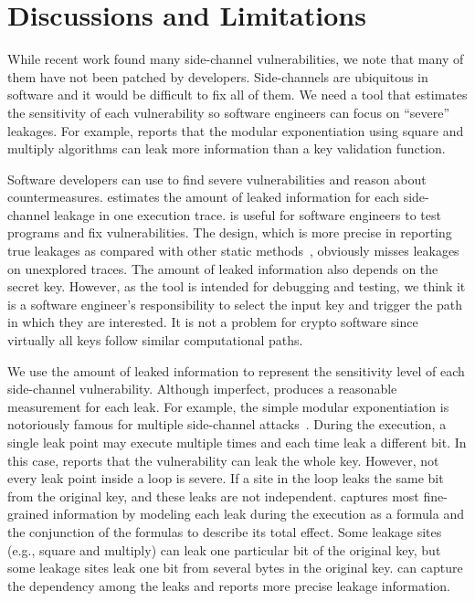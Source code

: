 \section{Discussions and Limitations}
While recent work found many side-channel vulnerabilities, 
we note that many of them have not been patched by developers.
Side-channels are ubiquitous in software and it would be difficult to fix all of them. 
We need a tool that estimates the sensitivity of each vulnerability
so software engineers can focus on
``severe'' leakages. For example, \tool{} reports that 
the modular exponentiation using square and multiply algorithms can
leak more information than a key validation function.

Software developers can use \tool{} to find severe vulnerabilities
and reason about countermeasures.
\tool{} estimates the amount of leaked information for each side-channel leakage
in one execution trace. \tool{} is useful for software
engineers to test programs and fix vulnerabilities.
The design, which is more precise in reporting true leakages as compared with other static
methods~\cite{197207,BacelarAlmeida:2013:FVS:2483313.2483334}, obviously misses
leakages on unexplored traces. The amount of leaked information also depends on the secret key.
However, as the tool is intended for debugging and testing,
we think it is a software engineer's responsibility to select the input key and trigger 
the path in which they are interested. It is not a problem for crypto software 
since virtually all keys follow similar computational paths.

We use the amount of leaked information to represent the sensitivity level of 
each side-channel vulnerability. Although imperfect, \tool{} produces a reasonable 
measurement for each leak. For example, the simple modular exponentiation is 
notoriously famous for multiple side-channel attacks~\cite{kocher1996timing}. 
During the execution, a single leak point may execute multiple times
and each time leak a different bit. In this case, \tool{} reports that the 
vulnerability can leak the whole key. However, not every leak point inside a 
loop is severe. If a site in the loop leaks the same bit from the 
original key, and these leaks are not independent. \tool{} captures most 
fine-grained information by modeling each leak during the execution as a 
formula and the conjunction of the formulas to describe its total effect. 
Some leakage sites (e.g., square and multiply) 
can leak one particular bit of the original key, but some leakage sites leak one bit 
from several bytes in the original key. \tool{} can capture the dependency among the leaks and
reports more precise leakage information.

